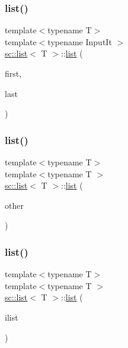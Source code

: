 \subsubsection{\texorpdfstring{list()}{list()}\hspace{0.1cm}{\footnotesize\ttfamily [8/10]}}
{\footnotesize\ttfamily template$<$typename T$>$ \\
template$<$typename Input\+It $>$ \\
\mbox{\hyperlink{classsc_1_1list}{sc\+::list}}$<$ T $>$\+::\mbox{\hyperlink{classsc_1_1list}{list}} (\begin{DoxyParamCaption}\item[{Input\+It}]{first,  }\item[{Input\+It}]{last }\end{DoxyParamCaption})}

\mbox{\label{classsc_1_1list_ac2a2da400f459b541ff839cae88a5d99}} 
\subsubsection{\texorpdfstring{list()}{list()}\hspace{0.1cm}{\footnotesize\ttfamily [9/10]}}
{\footnotesize\ttfamily template$<$typename T$>$ \\
template$<$typename T $>$ \\
\mbox{\hyperlink{classsc_1_1list}{sc\+::list}}$<$ T $>$\+::\mbox{\hyperlink{classsc_1_1list}{list}} (\begin{DoxyParamCaption}\item[{const \mbox{\hyperlink{classsc_1_1list}{list}}$<$ T $>$ \&}]{other }\end{DoxyParamCaption})}

\mbox{\label{classsc_1_1list_a1ebf25d397d69908199b7e25edacf16b}} 
\subsubsection{\texorpdfstring{list()}{list()}\hspace{0.1cm}{\footnotesize\ttfamily [10/10]}}
{\footnotesize\ttfamily template$<$typename T$>$ \\
template$<$typename T $>$ \\
\mbox{\hyperlink{classsc_1_1list}{sc\+::list}}$<$ T $>$\+::\mbox{\hyperlink{classsc_1_1list}{list}} (\begin{DoxyParamCaption}\item[{std\+::initializer\+\_\+list$<$ T $>$}]{ilist }\end{DoxyParamCaption})}



